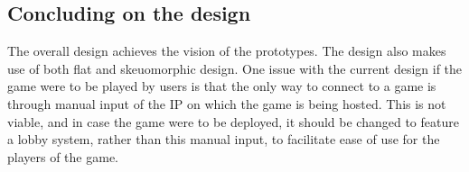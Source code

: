 \subsection{Concluding on the design}
The overall design achieves the vision of the prototypes.
The design also makes use of both flat and skeuomorphic design.
One issue with the current design if the game were to be played by users is that the only way to connect to a game is through manual input of the IP on which the game is being hosted.
This is not viable, and in case the game were to be deployed, it should be changed to feature a lobby system, rather than this manual input, to facilitate ease of use for the players of the game.